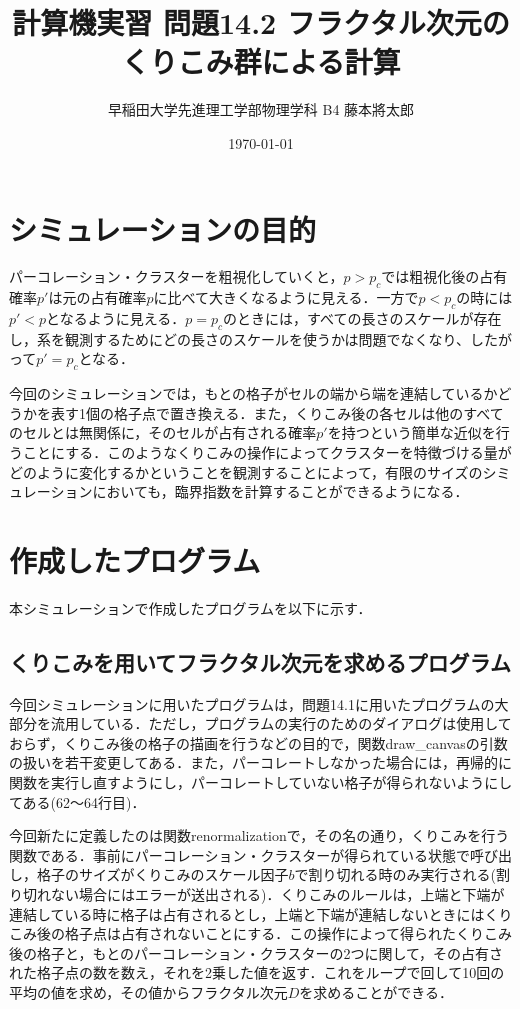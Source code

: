 \documentclass{jsarticle}
\title{計算機実習 問題14.2 フラクタル次元のくりこみ群による計算}
\author{早稲田大学先進理工学部物理学科 B4 藤本將太郎}
\date{\today}
\begin{document}
\maketitle
    
    \section{シミュレーションの目的}
    
    パーコレーション・クラスターを粗視化していくと，$p>p_{c}$では粗視化後の占有確率$p'$は元の占有確率$p$に比べて大きくなるように見える．一方で$p<p_{c}$の時には$p'<p$となるように見える．$p=p_{c}$のときには，すべての長さのスケールが存在し，系を観測するためにどの長さのスケールを使うかは問題でなくなり、したがって$p' = p_{c}$となる．
    
    今回のシミュレーションでは，もとの格子がセルの端から端を連結しているかどうかを表す1個の格子点で置き換える．また，くりこみ後の各セルは他のすべてのセルとは無関係に，そのセルが占有される確率$p'$を持つという簡単な近似を行うことにする．このようなくりこみの操作によってクラスターを特徴づける量がどのように変化するかということを観測することによって，有限のサイズのシミュレーションにおいても，臨界指数を計算することができるようになる．
    
    \section{作成したプログラム}
        本シミュレーションで作成したプログラムを以下に示す．
        
        \subsection{くりこみを用いてフラクタル次元を求めるプログラム}
            
            今回シミュレーションに用いたプログラムは，問題14.1に用いたプログラムの大部分を流用している．ただし，プログラムの実行のためのダイアログは使用しておらず，くりこみ後の格子の描画を行うなどの目的で，関数draw\_canvasの引数の扱いを若干変更してある．また，パーコレートしなかった場合には，再帰的に関数を実行し直すようにし，パーコレートしていない格子が得られないようにしてある(62〜64行目)．
            
            今回新たに定義したのは関数renormalizationで，その名の通り，くりこみを行う関数である．事前にパーコレーション・クラスターが得られている状態で呼び出し，格子のサイズがくりこみのスケール因子$b$で割り切れる時のみ実行される(割り切れない場合にはエラーが送出される)．くりこみのルールは，上端と下端が連結している時に格子は占有されるとし，上端と下端が連結しないときにはくりこみ後の格子点は占有されないことにする．この操作によって得られたくりこみ後の格子と，もとのパーコレーション・クラスターの2つに関して，その占有された格子点の数を数え，それを2乗した値を返す．これをループで回して10回の平均の値を求め，その値からフラクタル次元$D$を求めることができる．
            
\end{document}
